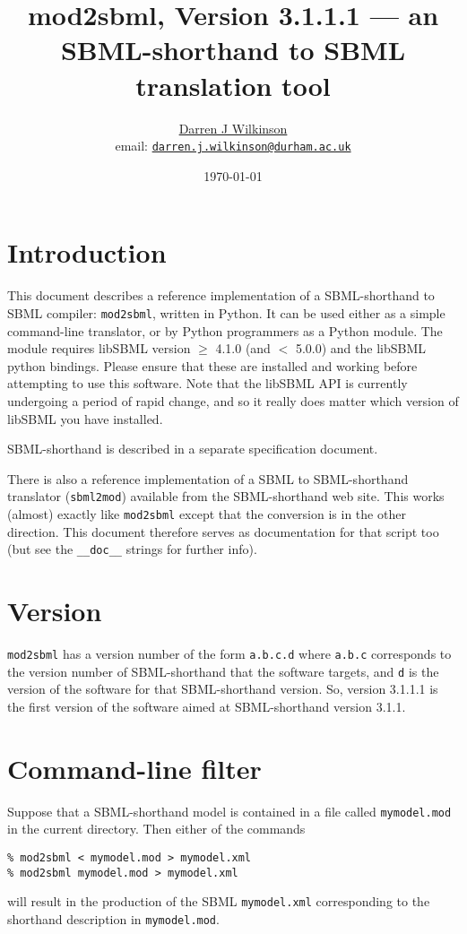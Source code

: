 \documentclass[12pt,a4paper]{article}
\title{mod2sbml, Version 3.1.1.1 --- an SBML-shorthand to SBML
translation tool}
\author{\href{https://darrenjw.github.io/}{Darren J
Wilkinson}\\
email: \href{mailto:darren.j.wilkinson@durham.ac.uk}{\texttt{darren.j.wilkinson@durham.ac.uk}}}
\date{\today}
\begin{document}
\sf
\maketitle

\section{Introduction}

This document describes a reference implementation of a SBML-shorthand
to SBML compiler: \verb$mod2sbml$, written in Python. It can be
used either as a simple command-line translator, or by Python
programmers as a Python module. The module requires libSBML version
$\geq$ 4.1.0 (and $<$ 5.0.0)
and the libSBML python bindings. Please ensure that these are installed and
working before attempting to use this software. Note that the libSBML
API is currently undergoing a period of rapid change, and so it really
does matter which version of libSBML you have installed.

SBML-shorthand is described in a separate specification document.

There is also a reference implementation of a SBML
to SBML-shorthand translator (\verb$sbml2mod$)
available from the
SBML-shorthand web site. This works (almost) exactly like \verb$mod2sbml$
except that the conversion is in the other direction. This document
therefore serves as documentation for that script too (but see the
\verb$__doc__$ strings for further info).

\section{Version}

\verb$mod2sbml$ has a version number of the form \verb$a.b.c.d$
where \verb$a.b.c$
corresponds to the version number of SBML-shorthand that the software
targets, and \verb$d$ is the version of the software for that
SBML-shorthand version. So, version 3.1.1.1 is the first version of
the software aimed at SBML-shorthand version 3.1.1.

\section{Command-line filter}

Suppose that a SBML-shorthand model is contained in a file called
\verb$mymodel.mod$ in the current directory. Then either of the commands
\begin{verbatim}
% mod2sbml < mymodel.mod > mymodel.xml
% mod2sbml mymodel.mod > mymodel.xml
\end{verbatim}
will result in the production of the SBML \verb$mymodel.xml$
corresponding to the shorthand description in \verb$mymodel.mod$.
\end{document}
